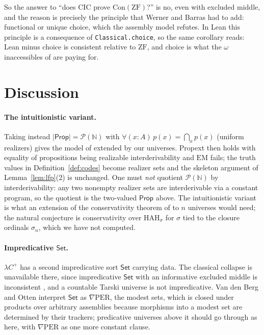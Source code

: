 \documentclass[10pt]{article}
\newcommand{\N}{\mathbb{N}}
\newcommand{\Prop}{\mathsf{Prop}}
\newcommand{\Set}{\mathsf{Set}}
\newcommand{\CIC}{\mathrm{CIC}}
\newcommand{\ZF}{\mathrm{ZF}}
\newcommand{\HAH}{\mathrm{HAH}}
\newcommand{\EM}{\mathrm{EM}}
\newcommand{\Con}{\mathrm{Con}}
\newcommand{\PP}{\mathcal{P}}
\begin{document}
So the answer to ``does $\CIC$ prove $\Con(\ZF)$?'' is no, even with excluded
middle, and the reason is precisely the principle that Werner and Barras had
to add: functional or unique choice, which the assembly model refutes. In Lean
this principle is a consequence of \texttt{Classical.choice}, so the same
corollary reads: Lean minus choice is consistent relative to $\ZF$, and choice
is what the $\omega$ inaccessibles of \cite{carneiro19} are paying for.

\section{Discussion}\label{sec:discussion}

\paragraph{The intuitionistic variant.}
Taking instead $|\Prop|=\PP(\N)$ with $\forall(x{:}A)\,p(x)=\bigcap_x p(x)$
(uniform realizers) gives the model of \cite{vdbergotten23} extended by our
universes. Propext then holds with equality of propositions being realizable
interderivability and $\EM$ fails; the truth values in
Definition~\ref{def:codes} become realizer sets and the skeleton argument
of Lemma~\ref{lem:lfp}(2) is unchanged. One must
\emph{not} quotient $\PP(\N)$ by interderivability: any two nonempty
realizer sets are interderivable via a constant program, so the quotient is
the two-valued $\Prop$ above. The intuitionistic variant is what an
extension of the conservativity theorem of \cite{vdbergotten23} to $n$
universes would need; the natural conjecture is conservativity over
$\HAH_\sigma$ for $\sigma$ tied to the closure ordinals $\sigma_n$, which we
have not computed.

\paragraph{Impredicative $\Set$.}
$\lambda C^+$ has a second impredicative sort $\Set$ carrying data. The
classical collapse is unavailable there, since impredicative $\Set$ with an
informative excluded middle is inconsistent \cite{chicli02}, and a countable
Tarski universe is not impredicative. Van den Berg and Otten interpret
$\Set$ as $\nabla\mathrm{PER}$, the modest sets, which is closed under
products over arbitrary assemblies because morphisms into a modest set are
determined by their trackers; predicative universes above it should go
through as here, with $\nabla\mathrm{PER}$ as one more constant clause.
\end{document}
